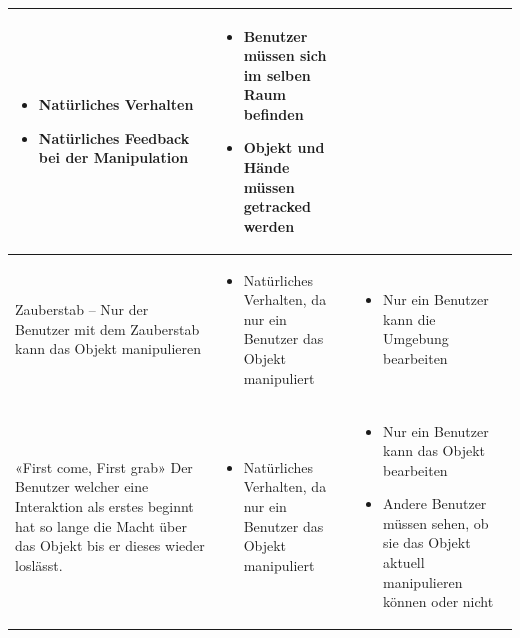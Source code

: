 \begin{center}
\begin{tabularx} {\textwidth} { | B | B | B | }
\begin{itemize} [leftmargin=*,noitemsep,topsep=0pt]
			\item Natürliches Verhalten
			\item Natürliches Feedback bei der Manipulation
		\end{itemize} & 
		\begin{itemize} [leftmargin=*,noitemsep,topsep=0pt]
			\item Benutzer müssen sich im selben Raum befinden
			\item Objekt und Hände müssen getracked werden
		\end{itemize} \\
		\hline
		\vspace{1pt}
		Zauberstab – Nur der Benutzer mit dem Zauberstab kann das Objekt manipulieren &
		\begin{itemize} [leftmargin=*,noitemsep,topsep=0pt]
			\item Natürliches Verhalten, da nur ein Benutzer das Objekt manipuliert
		\end{itemize} &
		\begin{itemize} [leftmargin=*,noitemsep,topsep=0pt]
			\item Nur ein Benutzer kann die Umgebung bearbeiten
		\end{itemize} \\
		\hline	
		\vspace{1pt}
		«First come, First grab» Der Benutzer welcher eine Interaktion als erstes beginnt hat so lange die Macht über das Objekt bis er dieses wieder loslässt. & 
		\begin{itemize} [leftmargin=*,noitemsep,topsep=0pt]
			\item Natürliches Verhalten, da nur ein Benutzer das Objekt manipuliert
		\end{itemize} &
		\begin{itemize} [leftmargin=*,noitemsep,topsep=0pt]
			\item Nur ein Benutzer kann das Objekt bearbeiten
			\item Andere Benutzer müssen sehen, ob sie das Objekt aktuell manipulieren können oder nicht
		\end{itemize} \\
		\hline	
	\end{tabularx}
\end{center}
\label{tbl:varianten_gleichzeitige_interaktion}

